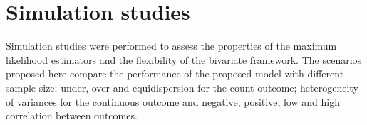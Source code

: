 \documentclass[useAMS,referee]{biom}
\begin{document}
%		
%		




\section{Simulation studies}

Simulation studies were performed to assess the properties of the maximum likelihood estimators and the flexibility of the bivariate framework. The scenarios proposed here compare the performance of the proposed model with different sample size; under, over and equidispersion for the count outcome; heterogeneity of variances for the continuous outcome and negative, positive,  low and high correlation between outcomes.
\end{document}
